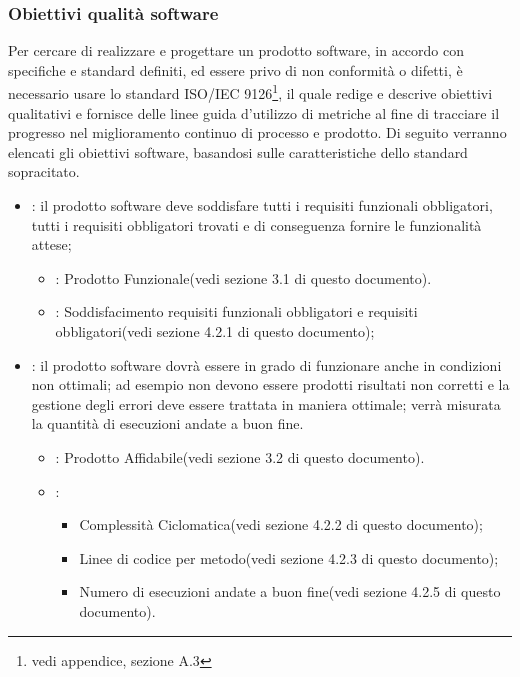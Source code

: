 \subsubsection{Obiettivi qualità software}
Per cercare di realizzare e progettare un prodotto software, in accordo con specifiche e standard definiti, ed essere privo di non conformità o difetti, è necessario usare lo standard ISO/IEC 9126\footnote{vedi appendice, sezione A.3}, il quale redige e descrive obiettivi qualitativi e fornisce delle linee guida d'utilizzo di metriche al fine di tracciare il progresso nel miglioramento continuo di processo e prodotto. 
Di seguito verranno elencati gli obiettivi software, basandosi sulle caratteristiche dello standard sopracitato. 
\begin{itemize}
\item {}: il prodotto software deve soddisfare tutti i requisiti funzionali obbligatori, tutti i requisiti obbligatori trovati e di conseguenza fornire le funzionalità attese;
\begin{itemize}
\item {}: Prodotto Funzionale(vedi sezione 3.1 di questo documento).
\item {}: Soddisfacimento requisiti funzionali obbligatori e requisiti obbligatori(vedi sezione 4.2.1 di questo documento);
\end{itemize}
\item {}: il prodotto software dovrà essere in grado di funzionare anche in condizioni non ottimali; ad esempio non devono essere prodotti risultati non corretti e la gestione degli errori deve essere trattata in maniera ottimale; verrà misurata la quantità di esecuzioni andate a buon fine.
\begin{itemize}
\item {}: Prodotto Affidabile(vedi sezione 3.2 di questo documento).
\item {}:
\begin{itemize}
\item Complessità Ciclomatica(vedi sezione 4.2.2 di questo documento);
\item Linee di codice per metodo(vedi sezione 4.2.3 di questo documento);
\item Numero di esecuzioni andate a buon fine(vedi sezione 4.2.5 di questo documento).
\end{itemize}
\end{itemize}

\end{itemize}
